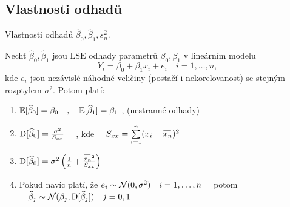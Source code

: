 \subsection{Vlastnosti odhadů}
Vlastnosti odhadů $ \widehat{\beta}_{0} , \widehat{\beta}_{1} ,  s_{n}^{2} $.
\begin{theorem}
   Nechť $ \widehat{\beta}_{0} , \widehat{\beta}_{1} $ jsou $ \mathrm{LSE} $ odhady parametrů $ \beta_{0}, \beta_{1} $ v lineárním modelu 
   $$
   		Y_{i} = \beta_{0} + \beta_{1} x_{i} + e_{i} \quad i = 1 , \dots , n ,
   $$
   kde $ e_{i} $ jsou nezávislé náhodné veličiny (postačí i nekorelovanost) se stejným rozptylem $ \sigma^{2} $. Potom platí:
   \begin{enumerate}
  \item $ \mathbb{E} [ \widehat{\beta}_{0} ] = \beta_{0} \quad , \quad \mathbb{E} [ \widehat{\beta}_{1} ] = \beta_{1} $ , (nestranné odhady)
  \item $  \mathrm{D} [ \widehat{\beta}_{0} ] = \frac{\sigma^{2}}{S_{xx}}  \quad $ , kde $ \quad S_{xx} = \sumin (x_{i} - \oxnn )^{2} $
  \item $ \D [ \widehat{\beta}_{0} ] = \sigma^{2} \left( \frac{1}{n} + \frac{\oxnn ^{2}}{S_{xx}} \right) $
  \item Pokud navíc platí, že $ e_{i} \sim \mathcal{N} ( 0 , \sigma^{2} ) \quad i = 1 , \dots , n \quad $ potom $ \quad \widehat{\beta}_{j} \sim \mathcal{N} ( \beta_{j} , \mathrm{D} [ \widehat{\beta}_{j} ] ) \quad j = 0 , 1  $ 
\end{enumerate}
\end{theorem}
